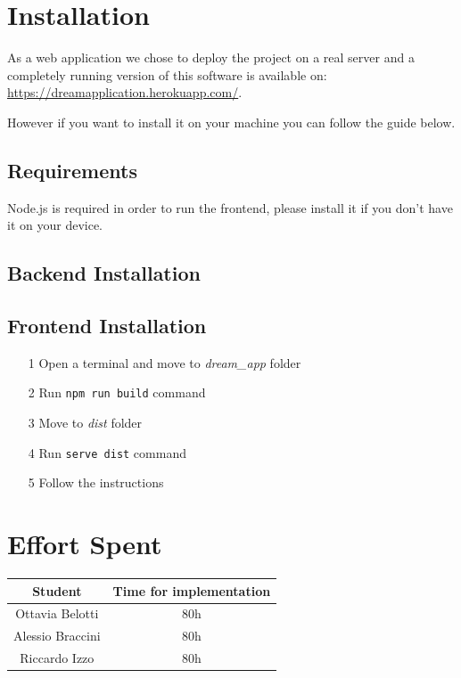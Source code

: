 \documentclass[table, 12pt]{article}
\begin{document}


\section{Installation}
As a web application we chose to deploy the project on a real server and
a completely running version of this software is available on:
\url{https://dreamapplication.herokuapp.com/}.

However if you want to install it on your machine you can follow the guide below.
\subsection{Requirements}
Node.js is required in order to run the frontend, please install it if you don't
have it on your device.

\subsection{Backend Installation}
\subsection{Frontend Installation}

\begin{itemize}
    \item [1] Open a terminal and move to \textit{dream\_app} folder
    \item [2] Run \texttt{npm run build} command
    \item [3] Move to \textit{dist} folder
    \item [4] Run \texttt{serve dist} command
    \item [5] Follow the instructions
\end{itemize}

\section{Effort Spent}
\begin{tabular}{|c||c|}
    \hline
    Student & Time for implementation\\ \hline
    Ottavia Belotti & 80h\\
    Alessio Braccini & 80h\\
    Riccardo Izzo & 80h\\
    \hline
\end{tabular}
\end{document}
